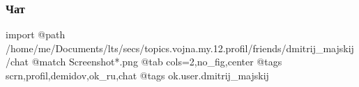  
 
 
 
 

\subsubsection{Чат}

\ifcmt
 import
 @path /home/me/Documents/lts/secs/topics.vojna.my.12.profil/friends/dmitrij_majskij/chat
 @match Screenshot*.png
 @tab cols=2,no_fig,center
 @tags scrn,profil,demidov,ok_ru,chat
 @tags ok.user.dmitrij_majskij
\fi
